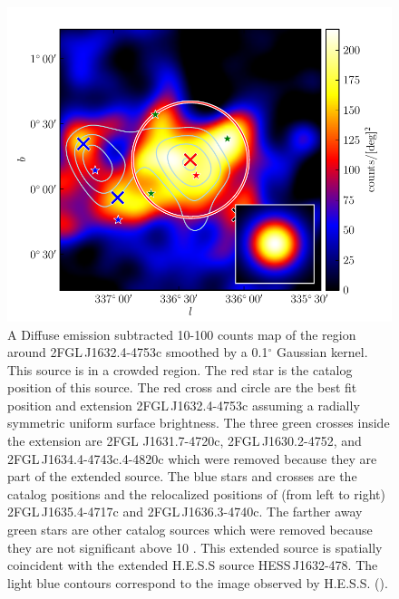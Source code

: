 \documentclass[12pt,preprint]{aastex}
\newcommand{\gev}{\text{GeV}\xspace}
\newcommand{\tev}{\text{TeV}\xspace}
\renewcommand{\deg}{\ensuremath{^\circ}\xspace}
\begin{document}
\begin{figure}
  \begin{center}
    \includegraphics[type=pdf,ext=.pdf,read=.pdf]{source_plots/source_1FGL_J1632.9-4802c}
  \end{center}
  \caption{A Diffuse emission subtracted 10-100
  \gev counts map of the region around 2FGL\,J1632.4-4753c smoothed by
  a 0.1\deg Gaussian kernel.  This source is in a crowded region.
  The red star is the catalog position of this source.  The red
  cross and circle are the best fit position and extension 2FGL\,J1632.4-4753c 
  assuming a radially
  symmetric uniform surface brightness.
  The three
  green crosses inside the extension are 2FGL
  J1631.7-4720c, 2FGL\,J1630.2-4752, and 2FGL\,J1634.4-4743c.4-4820c
  which were removed because they are part
  of the extended source.  The blue stars and crosses are the catalog
  positions and the relocalized positions of (from left to right)
  2FGL\,J1635.4-4717c and 2FGL\,J1636.3-4740c.  The farther away green
  stars are other catalog sources which were removed because they are
  not significant above 10 \gev.  This extended source is spatially
  coincident with the extended H.E.S.S source HESS\,J1632-478.
  The light blue contours correspond to the \tev image observed by H.E.S.S.
  (\cite{hess_plane_survey}).  
  }\label{1FGL_J1632.9-4802c}
\end{figure}
\end{document}
